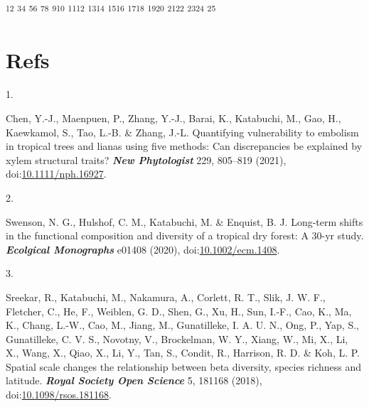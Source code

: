 \documentclass[
]{article}
\author{}
\date{}
\newlength{\cslhangindent}
\newlength{\csllabelwidth}
\newlength{\cslentryspacingunit} %
\newenvironment{CSLReferences}[2] %
 {%
  \setlength{\parindent}{0pt}
  \ifodd #1
  \let\oldpar\par
  \def\par{\hangindent=\cslhangindent\oldpar}
  \fi
  \setlength{\parskip}{#2\cslentryspacingunit}
 }%
 {}
\newcommand{\CSLLeftMargin}[1]{\parbox[t]{\csllabelwidth}{#1}}
\newcommand{\CSLRightInline}[1]{\parbox[t]{\linewidth - \csllabelwidth}{#1}\break}
\begin{document}
\textsuperscript{1}\textsuperscript{2}
\textsuperscript{3}\textsuperscript{4}
\textsuperscript{5}\textsuperscript{6}
\textsuperscript{7}\textsuperscript{8}
\textsuperscript{9}\textsuperscript{10}
\textsuperscript{11}\textsuperscript{12}
\textsuperscript{13}\textsuperscript{14}
\textsuperscript{15}\textsuperscript{16}
\textsuperscript{17}\textsuperscript{18}
\textsuperscript{19}\textsuperscript{20}
\textsuperscript{21}\textsuperscript{22}
\textsuperscript{23}\textsuperscript{24} \textsuperscript{25}

\hypertarget{refs}{%
\section*{Refs}\label{refs}}

\hypertarget{refs}{}
\begin{CSLReferences}{0}{0}
\leavevmode{}%
\CSLLeftMargin{1. }
\CSLRightInline{Chen, Y.-J., Maenpuen, P., Zhang, Y.-J., Barai, K.,
Katabuchi, M., Gao, H., Kaewkamol, S., Tao, L.-B. \& Zhang, J.-L.
Quantifying vulnerability to embolism in tropical trees and lianas using
five methods: Can discrepancies be explained by xylem structural traits?
\textbf{\emph{New Phytologist}} 229, 805--819 (2021),
doi:\href{https://doi.org/10.1111/nph.16927}{10.1111/nph.16927}.}

\leavevmode{}%
\CSLLeftMargin{2. }
\CSLRightInline{Swenson, N. G., Hulshof, C. M., Katabuchi, M. \&
Enquist, B. J. Long-term shifts in the functional composition and
diversity of a tropical dry forest: A 30-yr study.
\textbf{\emph{Ecolgical Monographs}} e01408 (2020),
doi:\href{https://doi.org/10.1002/ecm.1408}{10.1002/ecm.1408}.}

\leavevmode{}%
\CSLLeftMargin{3. }
\CSLRightInline{Sreekar, R., Katabuchi, M., Nakamura, A., Corlett, R.
T., Slik, J. W. F., Fletcher, C., He, F., Weiblen, G. D., Shen, G., Xu,
H., Sun, I.-F., Cao, K., Ma, K., Chang, L.-W., Cao, M., Jiang, M.,
Gunatilleke, I. A. U. N., Ong, P., Yap, S., Gunatilleke, C. V. S.,
Novotny, V., Brockelman, W. Y., Xiang, W., Mi, X., Li, X., Wang, X.,
Qiao, X., Li, Y., Tan, S., Condit, R., Harrison, R. D. \& Koh, L. P.
Spatial scale changes the relationship between beta diversity, species
richness and latitude. \textbf{\emph{Royal Society Open Science}} 5,
181168 (2018),
doi:\href{https://doi.org/10.1098/rsos.181168}{10.1098/rsos.181168}.}


\end{CSLReferences}
\end{document}
